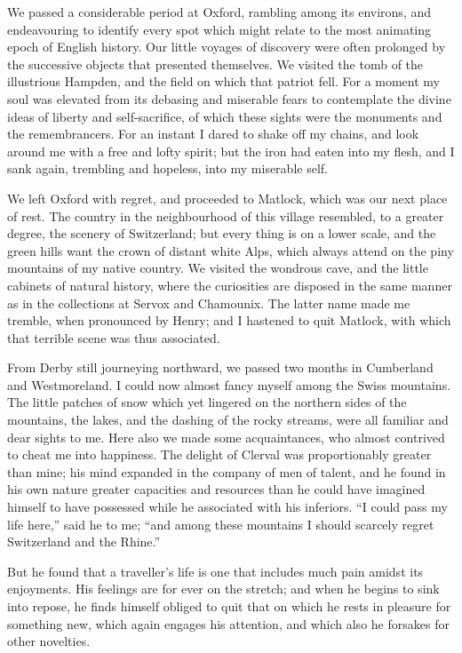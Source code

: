 We passed a considerable period at
Oxford, rambling among its environs,
and endeavouring to identify every spot
which might relate to the most animating
epoch of English history. Our
little voyages of discovery were often
prolonged by the successive objects that
presented themselves. We visited the
tomb of the illustrious Hampden, and
the field on which that patriot fell. For
a moment my soul was elevated from
its debasing and miserable fears to contemplate
the divine ideas of liberty and
self-sacrifice, of which these sights were
the monuments and the remembrancers.
For an instant I dared to shake off my
chains, and look around me with a free
and lofty spirit; but the iron had eaten
into my flesh, and I sank again, trembling
and hopeless, into my miserable
self.

We left Oxford with regret, and proceeded
to Matlock, which was our next
place of rest. The country in the
neighbourhood of this village resembled,
to a greater degree, the scenery
of Switzerland; but every thing is
on a lower scale, and the green hills
want the crown of distant white Alps,
which always attend on the piny
mountains of my native country. We
visited the wondrous cave, and the little
cabinets of natural history, where the
curiosities are disposed in the same
manner as in the collections at Servox
and Chamounix. The latter name made
me tremble, when pronounced by Henry;
and I hastened to quit Matlock, with
which that terrible scene was thus associated.

From Derby still journeying northward,
we passed two months in Cumberland
and Westmoreland. I could
now almost fancy myself among the
Swiss mountains. The little patches
of snow which yet lingered on the
northern sides of the mountains, the
lakes, and the dashing of the rocky
streams, were all familiar and dear
sights to me. Here also we made some
acquaintances, who almost contrived to
cheat me into happiness. The delight
of Clerval was proportionably greater
than mine; his mind expanded in the
company of men of talent, and he found
in his own nature greater capacities and
resources than he could have imagined
himself to have possessed while he associated
with his inferiors. ``I could pass
my life here,'' said he to me; ``and among
these mountains I should scarcely regret
Switzerland and the Rhine.''

But he found that a traveller's life is
one that includes much pain amidst
its enjoyments. His feelings are for
ever on the stretch; and when he begins
to sink into repose, he finds himself
obliged to quit that on which he
rests in pleasure for something new,
which again engages his attention, and
which also he forsakes for other novelties.

